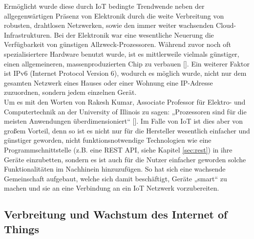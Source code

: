 Ermöglicht wurde diese durch IoT bedingte Trendwende neben der allgegenwärtigen Präsenz von Elektronik durch die weite Verbreitung von robusten, drahtlosen Netzwerken, sowie den immer weiter wachsenden Cloud-Infrastrukturen. Bei der Elektronik war eine wesentliche Neuerung die Verfügbarkeit von günstigen Allzweck-Prozessoren. Während zuvor noch oft spezialisiertere Hardware benutzt wurde, ist es mittlerweile vielmals günstiger, einen allgemeineren, massenproduzierten Chip zu verbauen [\cite{besprokeCpus}]. Ein weiterer Faktor ist IPv6 (Internet Protocol Version 6), wodurch es möglich wurde, nicht nur dem gesamten Netzwerk eines Hauses oder einer Wohnung eine IP-Adresse zuzuordnen, sondern jedem einzelnen Gerät.\\
Um es mit den Worten von Rakesh Kumar, Associate Professor für Elektro- und Computertechnik an der University of Illinois zu sagen: „Prozessoren sind für die meisten Anwendungen überdimensioniert“ [\cite{besprokeCpus}]. Im Falle von IoT ist dies aber von großem Vorteil, denn so ist es nicht nur für die Hersteller wesentlich einfacher und günstiger geworden, nicht funktionsnotwendige Technologien wie eine Programmschnittstelle (z.B. eine REST API, siehe Kapitel \ref{sec:rest}) in ihre Geräte einzubetten, sondern es ist auch für die Nutzer einfacher geworden solche Funktionalitäten im Nachhinein hinzuzufügen. So hat sich eine wachsende Gemeinschaft aufgebaut, welche sich damit beschäftigt, Geräte „smart“ zu machen und sie an eine Verbindung an ein IoT Netzwerk vorzubereiten.

\subsection{Verbreitung und Wachstum des Internet of Things}
\label{subsec:iot_verbreitung}

